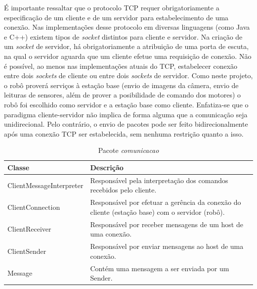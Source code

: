 É importante ressaltar que o protocolo TCP requer obrigatoriamente a especificação de um cliente e de um servidor para estabelecimento de uma conexão. Nas implementações desse protocolo em diversas linguagens (como Java e C++) existem tipos de \textit{socket} distintos para cliente e servidor. Na criação de um \textit{socket} de servidor, há obrigatoriamente a atribuição de uma porta de escuta, na qual o servidor aguarda que um cliente efetue uma requisição de conexão. Não é possível, ao menos nas implementações atuais do TCP, estabelecer conexão entre dois \textit{sockets} de cliente ou entre dois \textit{sockets} de servidor. Como neste projeto, o robô proverá serviços à estação base (envio de imagens da câmera, envio de leituras de sensores, além de prover a posibilidade de comando dos motores) o robô foi escolhido como servidor e a estação base como cliente. Enfatiza-se que o paradigma cliente-servidor não implica de forma alguma que a comunicação seja unidirecional. Pelo contrário, o envio de pacotes pode ser feito bidirecionalmente após uma conexão TCP ser estabelecida, sem nenhuma restrição quanto a isso.

\begin{table}[h]
  \centering
  \caption{Pacote \textit{comunicacao}}
  \begin{tabular}{p{6cm}p{8cm}}
    \toprule
    \textbf{Classe} & \textbf{Descrição} \\ 
    \midrule
    ClientMessageInterpreter & Responsável pela interpretação dos comandos recebidos pelo cliente. \\ \hline
    ClientConnection & Responsável por efetuar a gerência da conexão do cliente (estação base) com o servidor (robô). \\ \hline
    ClientReceiver & Responsável por receber mensagens de um host de uma conexão. \\ \hline
    ClientSender & Responsável por enviar mensagens ao host de uma conexão. \\ \hline
    Message & Contém uma mensagem a ser enviada por um Sender. \\ 
    \bottomrule
  \end{tabular}%
  \label{tab:pacote_comunicacao}%
\end{table}%

